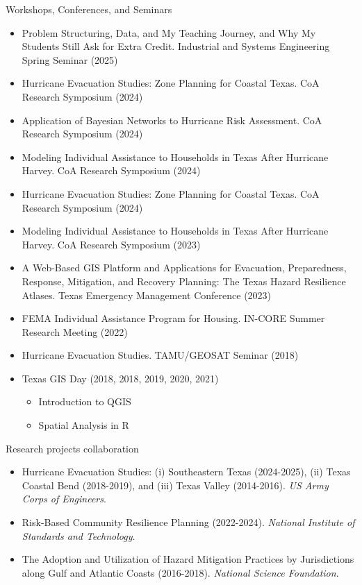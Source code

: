 \documentclass[11pt,oneside]{article}
\begin{document}
\vspace{3pt}

{Workshops, Conferences, and Seminars}
\begin{itemize}[leftmargin=20pt]
\item Problem Structuring, Data, and My Teaching Journey, and Why My Students Still Ask for Extra Credit. Industrial and Systems Engineering Spring Seminar (2025)
\item Hurricane Evacuation Studies: Zone Planning for Coastal Texas. CoA Research Symposium (2024)
\item Application of Bayesian Networks to Hurricane Risk Assessment. CoA Research Symposium (2024)
\item Modeling Individual Assistance to Households ​in Texas After Hurricane Harvey. CoA Research Symposium (2024)
\item Hurricane Evacuation Studies: Zone Planning for Coastal Texas. CoA Research Symposium (2024)
\item Modeling Individual Assistance to Households ​in Texas After Hurricane Harvey. CoA Research Symposium (2023)
\item A Web-Based GIS Platform and Applications for Evacuation, Preparedness, Response, Mitigation, and Recovery Planning: The Texas Hazard Resilience Atlases. Texas Emergency Management Conference (2023)\\
\item FEMA Individual Assistance Program for Housing. IN-CORE Summer Research Meeting (2022)
\item Hurricane Evacuation Studies. TAMU/GEOSAT Seminar (2018)
\item Texas GIS Day (2018, 2018, 2019, 2020, 2021)\\
\begin{itemize}
\item Introduction to QGIS
\item Spatial Analysis in R
\end{itemize}
\end{itemize}

\newpage

{Research projects collaboration}
\begin{itemize}[leftmargin=20pt]
\item Hurricane Evacuation Studies: (i) Southeastern Texas (2024-2025), (ii) Texas Coastal Bend (2018-2019), and (iii) Texas Valley (2014-2016). \emph{US Army Corps of Engineers}.
\item Risk-Based Community Resilience Planning (2022-2024). \emph{National Institute of Standards and Technology}.
\item The Adoption and Utilization of Hazard Mitigation Practices by Jurisdictions along Gulf and Atlantic Coasts (2016-2018). \emph{National Science Foundation}.
\end{itemize}
\end{document}
